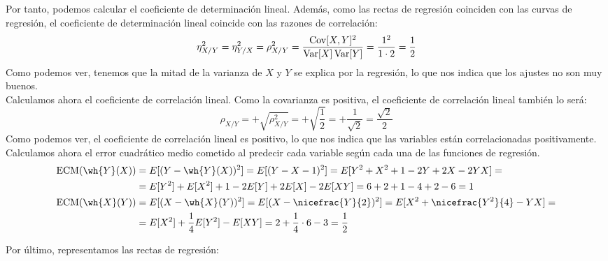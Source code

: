 \begin{ejercicio}
    Por tanto, podemos calcular el coeficiente de determinación lineal. Además, como las rectas de regresión coinciden con las curvas de regresión, el coeficiente de determinación lineal coincide con las razones de correlación:
    \begin{equation*}
        \eta_{X/Y}^2 = \eta_{Y/X}^2 = \rho_{X/Y}^2 = \dfrac{\operatorname{Cov}[X,Y]^2}{\operatorname{Var}[X]\operatorname{Var}[Y]} = \dfrac{1^2}{1\cdot 2} = \dfrac{1}{2}
    \end{equation*}
    Como podemos ver, tenemos que la mitad de la varianza de $X$ y $Y$ se explica por la regresión, lo que nos indica que los ajustes no son muy buenos.\\

    Calculamos ahora el coeficiente de correlación lineal. Como la covarianza es positiva, el coeficiente de correlación lineal también lo será:
    \begin{equation*}
        \rho_{X/Y} = +\sqrt{\rho_{X/Y}^2} = +\sqrt{\dfrac{1}{2}} = +\dfrac{1}{\sqrt{2}} = \dfrac{\sqrt{2}}{2}
    \end{equation*}
    Como podemos ver, el coeficiente de correlación lineal es positivo, lo que nos indica que las variables están correlacionadas positivamente.\\

    Calculamos ahora el error cuadrático medio cometido al predecir cada variable según cada una de las funciones de regresión.
    \begin{align*}
        \text{ECM}(\wh{Y}(X)) &= E[(Y-\wh{Y}(X))^2] = E[(Y-X-1)^2] = E[Y^2+X^2+1-2Y+2X-2YX] =\\
        &= E[Y^2]+E[X^2]+1-2E[Y]+2E[X]-2E[XY] = 6+2+1-4+2-6 = 1\\
        \text{ECM}(\wh{X}(Y)) &= E[(X-\wh{X}(Y))^2] = E[(X-\nicefrac{Y}{2})^2] = E[X^2+\nicefrac{Y^2}{4}-YX] =\\
        &= E[X^2]+\dfrac{1}{4}E[Y^2]-E[XY] = 2+\dfrac{1}{4}\cdot 6-3 = \frac{1}{2}
    \end{align*}

    Por último, representamos las rectas de regresión:
    \begin{figure}[H]
        \centering
    \end{figure}
\end{ejercicio}

